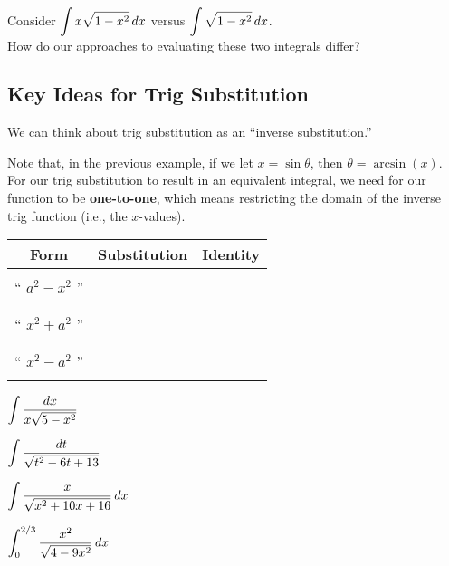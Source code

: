 \documentclass[12pt]{article}
\begin{document}
\newpage

\Example Consider $\displaystyle\int x\sqrt{1-x^2}\,dx$ versus $\displaystyle\int\sqrt{1-x^2}\,dx$. \\

How do our approaches to evaluating these two integrals differ?

\vfill

\subsection*{Key Ideas for Trig Substitution}

We can think about trig substitution as an ``inverse substitution.''

\vspace{15mm}

Note that, in the previous example, if we let $x=\sin\theta$, then $\theta=\arcsin(x)$. For our trig substitution to result in an equivalent integral, we need for our function to be \textbf{one-to-one}, which means restricting the domain of the inverse trig function (i.e., the $x$-values).

\begin{center}
\renewcommand{\arraystretch}{1.7}
\begin{tabular}{|c|c|c|}
\hline
\textbf{Form} & \textbf{Substitution} & \textbf{Identity}\\
\hline
& & \\
`` $a^2-x^2$ '' & \hspace{60mm} & \hspace{60mm} \\
& & \\
\hline
& & \\
`` $x^2+a^2$ '' & & \\
& & \\
\hline
& & \\
`` $x^2-a^2$ '' & & \\
& & \\
\hline
\end{tabular}
\end{center}

\newpage

\Example $\displaystyle\int\frac{dx}{x\sqrt{5-x^2}}$

\newpage

\Example $\displaystyle\int\frac{dt}{\sqrt{t^2-6t+13}}$

\newpage

\Example $\displaystyle\int\frac{x}{\sqrt{x^2+10x+16}}\,dx$

\newpage

\Example $\displaystyle\int_0^{2/3}\frac{x^2}{\sqrt{4-9x^2}}\,dx$
\end{document}
